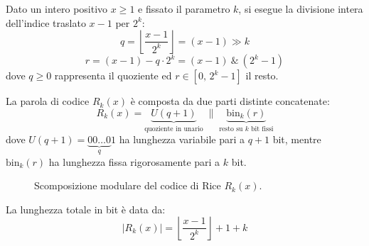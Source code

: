 Dato un intero positivo $x \ge 1$ e fissato il parametro $k$, si esegue la divisione intera dell'indice traslato $x - 1$ per $2^k$:
\begin{equation}
  q = \left\lfloor \frac{x - 1}{2^k} \right\rfloor = (x - 1) \gg k
\end{equation}
\begin{equation}
  r = (x - 1) - q \cdot 2^k = (x - 1) \ \& \ (2^k - 1)
\end{equation}
dove $q \ge 0$ rappresenta il quoziente ed $r \in [0, \, 2^k - 1]$ il resto.

\begin{definition}
La parola di codice $R_k(x)$ \`e composta da due parti distinte concatenate:
\begin{equation}
  R_k(x) = \underbrace{U(q + 1)}_{\text{quoziente in unario}} \;\|\; \underbrace{\text{bin}_k(r)}_{\text{resto su $k$ bit fissi}}
\end{equation}
dove $U(q+1) = \underbrace{00\dots0}_{q}1$ ha lunghezza variabile pari a $q + 1$ bit, mentre $\text{bin}_k(r)$ ha lunghezza fissa rigorosamente pari a $k$ bit.
\end{definition}

\begin{figure}[H]
\centering
{}
\caption{Scomposizione modulare del codice di Rice $R_k(x)$.}
\label{fig:struttura-rice}
\end{figure}

La lunghezza totale in bit \`e data da:
\begin{equation}
  |R_k(x)| = \left\lfloor \frac{x - 1}{2^k} \right\rfloor + 1 + k
\end{equation}

